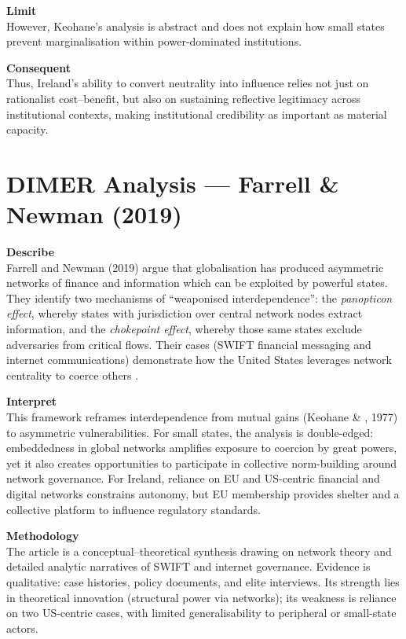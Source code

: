 \textbf{Limit} \\
However, Keohane’s analysis is abstract and does not explain how small states prevent marginalisation within power-dominated institutions.  

\textbf{Consequent} \\
Thus, Ireland’s ability to convert neutrality into influence relies not just on rationalist cost–benefit, but also on sustaining reflective legitimacy across institutional contexts, making institutional credibility as important as material capacity.  

\section*{DIMER Analysis — Farrell \& Newman (2019)}

\textbf{Describe} \\
Farrell and Newman (2019) argue that globalisation has produced asymmetric networks of finance and information which can be exploited by powerful states. They identify two mechanisms of ``weaponised interdependence'': the \textit{panopticon effect}, whereby states with jurisdiction over central network nodes extract information, and the \textit{chokepoint effect}, whereby those same states exclude adversaries from critical flows. Their cases (SWIFT financial messaging and internet communications) demonstrate how the United States leverages network centrality to coerce others \parencite{FARRELL_2019}.

\textbf{Interpret} \\
This framework reframes interdependence from mutual gains (Keohane \& , 1977) to asymmetric vulnerabilities. For small states, the analysis is double-edged: embeddedness in global networks amplifies exposure to coercion by great powers, yet it also creates opportunities to participate in collective norm-building around network governance. For Ireland, reliance on EU and US-centric financial and digital networks constrains autonomy, but EU membership provides shelter and a collective platform to influence regulatory standards.

\textbf{Methodology} \\
The article is a conceptual–theoretical synthesis drawing on network theory and detailed analytic narratives of SWIFT and internet governance. Evidence is qualitative: case histories, policy documents, and elite interviews. Its strength lies in theoretical innovation (structural power via networks); its weakness is reliance on two US-centric cases, with limited generalisability to peripheral or small-state actors.

